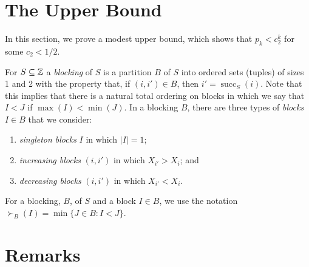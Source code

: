 \documentclass{patmorin}
\DeclareMathOperator{\cw}{succ}
\begin{document}
\section{The Upper Bound}

In this section, we prove a modest upper bound, which shows that $p_k <
c_2^k$ for some $c_2<1/2$. 

For $S\subseteq\mathbb{Z}$ a \emph{blocking} of $S$ is a partition $B$ of $S$
into ordered sets (tuples) of sizes 1 and 2 with the property that,
if $(i,i')\in B$, then $i'=\cw_S(i)$.  Note that this implies that
there is a natural total ordering on blocks in which we say that $I<J$
if $\max(I)<\min(J)$.  In a blocking $B$, there are three types of
\emph{blocks} $I\in B$ that we consider:
\begin{enumerate}
\item \emph{singleton blocks} $I$ in which $|I|=1$;
\item \emph{increasing blocks} $(i,i')$ in which $X_{i'} > X_{i}$; and
\item \emph{decreasing blocks} $(i,i')$ in which $X_{i'} < X_{i}$.
\end{enumerate}

For a blocking, $B$, of $S$ and a block $I\in B$, we use the notation
$\succ_B(I)=\min\{J\in B: I < J\}$.

\section{Remarks}



\end{document}
